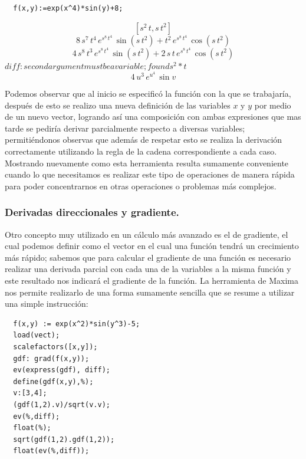 \documentclass[12pt]{article}
\begin{document}
  \begin{verbatim}
  f(x,y):=exp(x^4)*sin(y)+8;
  \end{verbatim}
  $$\left[ s^2\,t , s\,t^2 \right] $$
  $$8\,s^7\,t^4\,e^{s^8\,t^4}\,\sin \left(s\,t^2\right)+t^2\,e^{s^8\,t^
   4}\,\cos \left(s\,t^2\right)$$
   $$4\,s^8\,t^3\,e^{s^8\,t^4}\,\sin \left(s\,t^2\right)+2\,s\,t\,e^{s^8
    \,t^4}\,\cos \left(s\,t^2\right)$$
    $diff: second argument must be a variable; found s^2*t$
    $$4\,u^3\,e^{u^4}\,\sin v$$
    
    Podemos observar que al inicio se especificó la función con la que se trabajaría, después de esto se realizo una nueva definición de las variables $x$ y $y$ por medio de un nuevo vector, logrando así una composición con ambas expresiones que mas tarde se pediría derivar parcialmente respecto a diversas variables; permitiéndonos observas que además de respetar esto se realiza la derivación correctamente utilizando la regla de la cadena correspondiente a cada caso.\\
    
    Mostrando nuevamente como esta herramienta resulta sumamente conveniente cuando lo que necesitamos es realizar este tipo de operaciones de manera rápida para poder concentrarnos en otras operaciones o problemas más complejos.
  
  \subsubsection*{Derivadas direccionales y gradiente.}
  
  Otro concepto muy utilizado en un cálculo más avanzado es el de gradiente, el cual podemos definir como el vector en el cual una función tendrá un crecimiento más rápido; sabemos que para calcular el gradiente de una función es necesario realizar una derivada parcial con cada una de la variables a la misma función y este resultado nos indicará el gradiente de la función. La herramienta de Maxima nos permite realizarlo de una forma sumamente sencilla que se resume a utilizar una simple instrucción:
  \begin{verbatim}
  f(x,y) := exp(x^2)*sin(y^3)-5;
  load(vect);
  scalefactors([x,y]);
  gdf: grad(f(x,y));
  ev(express(gdf), diff);
  define(gdf(x,y),%);
  v:[3,4];
  (gdf(1,2).v)/sqrt(v.v);
  ev(%,diff);
  float(%);
  sqrt(gdf(1,2).gdf(1,2));
  float(ev(%,diff));
  \end{verbatim}
  
\end{document}
